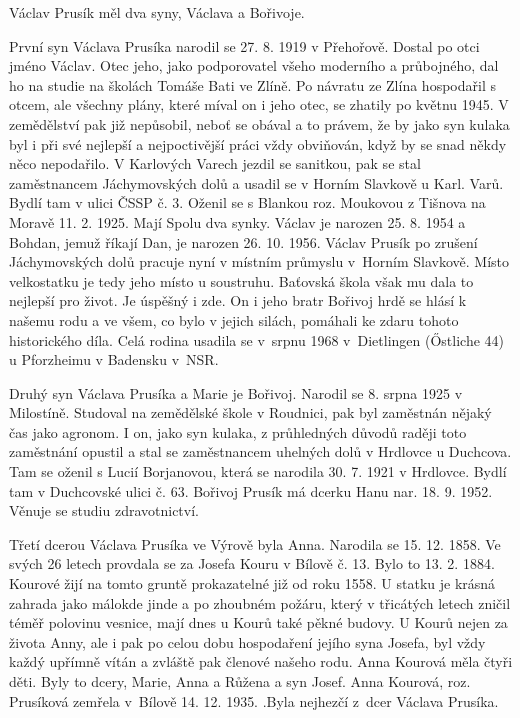 \documentclass[../dejiny-rodu-prusiku.tex]{subfiles}
\begin{document}
Václav Prusík měl dva syny, Václava a Bořivoje.

První syn Václava Prusíka narodil se 27. 8. 1919 v Přehořově. Dostal po otci jméno Václav. Otec jeho, jako podporovatel všeho moderního a průbojného, dal ho na studie na školách Tomáše Bati ve Zlíně. Po návratu ze Zlína hospodařil s otcem, ale všechny plány, které míval on i jeho otec, se zhatily po květnu 1945. V zemědělství pak již nepůsobil, neboť se obával a to prá­vem, že by jako syn kulaka byl i při své nejlepší a nejpoctivější práci vždy obviňován, když by se snad někdy něco nepodařilo. V Karlových Varech jezdil se sanitkou, pak se stal zaměstnancem Jáchymovských dolů a usadil se v Horním Slavkově u Karl. Varů. Bydlí tam v ulici ČSSP č. 3. Oženil se s Blankou roz. Moukovou z Tišnova na Moravě 11. 2. 1925. Mají Spolu dva synky. Václav je narozen 25. 8. 1954 a Bohdan, jemuž říkají Dan, je narozen 26. 10. 1956. Václav Prusík po zrušení Jáchy­movských dolů pracuje nyní v místním průmyslu v Horním Slavkově. Místo velkostatku je tedy jeho místo u soustruhu. Baťovská škola však mu dala to nejlepší pro život. Je úspěšný i zde. On i jeho bratr Bořivoj hrdě se hlásí k našemu rodu a ve všem, co bylo v jejich silách, pomáhali ke zdaru tohoto historického díla. Celá rodina usadila se v srpnu 1968 v Dietlingen (Őstliche 44) u Pforzheimu v Badensku v NSR.

Druhý syn Václava Prusíka a Marie je Bořivoj. Narodil se 8. srpna 1925 v Milostíně. Studoval na zemědělské škole v Roudnici, pak byl zaměstnán nějaký čas jako agronom. I on, jako syn kulaka, z průhledných důvo­dů raději toto zaměstnání opustil a stal se zaměstnan­cem uhelných dolů v Hrdlovce u Duchcova. Tam se oženil s Lucií Borjanovou, která se narodila 30. 7. 1921 v Hrdlovce. Bydlí tam v Duchcovské ulici č. 63. Bořivoj Pru­sík má dcerku Hanu nar. 18. 9. 1952. Věnuje se studiu zdravotnictví.

Třetí dcerou Václava Prusíka ve Výrově byla Anna. Narodila se 15. 12. 1858. Ve svých 26 letech provdala se za Josefa Kouru v Bílově č. 13. Bylo to 13. 2. 1884. Kourové žijí na tomto gruntě prokazatelné již od roku 1558. U statku je krásná zahrada jako málokde jinde a po zhoub­ném požáru, který v třicátých letech zničil téměř polo­vinu vesnice, mají dnes u Kourů také pěkné budovy. U Kourů nejen za života Anny, ale i pak po celou do­bu hospodaření jejího syna Josefa, byl vždy každý upřímně vítán a zvláště pak členové našeho rodu. Anna Kourová měla čtyři děti. Byly to dcery, Marie, Anna a Růžena a syn Josef. Anna Kourová, roz. Prusíková zemřela v Bílově 14. 12. 1935. .Byla nejhezčí z dcer Václava Prusíka.
\end{document}
